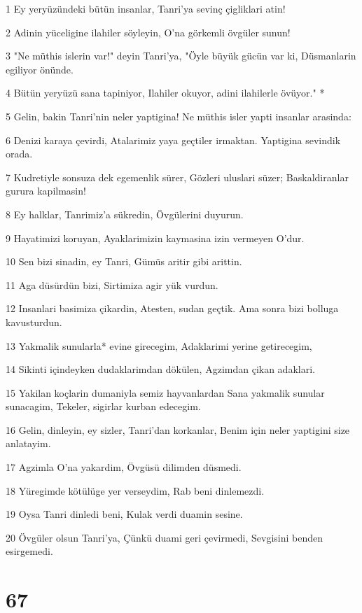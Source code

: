 \par 1 Ey yeryüzündeki bütün insanlar, Tanri'ya sevinç çigliklari atin!
\par 2 Adinin yüceligine ilahiler söyleyin, O'na görkemli övgüler sunun!
\par 3 "Ne müthis islerin var!" deyin Tanri'ya, "Öyle büyük gücün var ki, Düsmanlarin egiliyor önünde.
\par 4 Bütün yeryüzü sana tapiniyor, Ilahiler okuyor, adini ilahilerle övüyor." *
\par 5 Gelin, bakin Tanri'nin neler yaptigina! Ne müthis isler yapti insanlar arasinda:
\par 6 Denizi karaya çevirdi, Atalarimiz yaya geçtiler irmaktan. Yaptigina sevindik orada.
\par 7 Kudretiyle sonsuza dek egemenlik sürer, Gözleri uluslari süzer; Baskaldiranlar gurura kapilmasin!
\par 8 Ey halklar, Tanrimiz'a sükredin, Övgülerini duyurun.
\par 9 Hayatimizi koruyan, Ayaklarimizin kaymasina izin vermeyen O'dur.
\par 10 Sen bizi sinadin, ey Tanri, Gümüs aritir gibi arittin.
\par 11 Aga düsürdün bizi, Sirtimiza agir yük vurdun.
\par 12 Insanlari basimiza çikardin, Atesten, sudan geçtik. Ama sonra bizi bolluga kavusturdun.
\par 13 Yakmalik sunularla* evine girecegim, Adaklarimi yerine getirecegim,
\par 14 Sikinti içindeyken dudaklarimdan dökülen, Agzimdan çikan adaklari.
\par 15 Yakilan koçlarin dumaniyla semiz hayvanlardan Sana yakmalik sunular sunacagim, Tekeler, sigirlar kurban edecegim.
\par 16 Gelin, dinleyin, ey sizler, Tanri'dan korkanlar, Benim için neler yaptigini size anlatayim.
\par 17 Agzimla O'na yakardim, Övgüsü dilimden düsmedi.
\par 18 Yüregimde kötülüge yer verseydim, Rab beni dinlemezdi.
\par 19 Oysa Tanri dinledi beni, Kulak verdi duamin sesine.
\par 20 Övgüler olsun Tanri'ya, Çünkü duami geri çevirmedi, Sevgisini benden esirgemedi.

\chapter{67}

